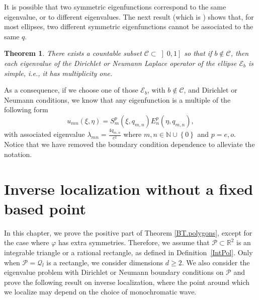 \documentclass{amsart}
\newtheorem{theorem}{Theorem}[section]
\theoremstyle{definition}
\theoremstyle{remark}
\renewcommand\geq\geqslant
\numberwithin{equation}{section}
\theoremstyle{definition}
\theoremstyle{remark}
\begin{document}
It is possible that two symmetric eigenfunctions correspond to the same eigenvalue, or to different eigenvalues. The next result (which is \cite[Theorem 1.1]{Hil}) shows that, for most ellipses, two different symmetric eigenfunctions cannot be associated to the same $q$.
\begin{theorem}\label{Hillariet}
	There exists a countable subset $\mathcal{C}\subset\left]0,1\right]$ so that if $b\notin\mathcal{C}$, then each eigenvalue of the Dirichlet or Neumann Laplace operator of the ellipse $\mathcal{E}_{b}$ is simple, i.e., it has multiplicity one.
\end{theorem}

As a consequence, if we choose one of those $\mathcal{E}_{b}$, with $b\notin\mathcal{C}$, and Dirichlet or Neumann conditions, we know that any eigenfunction is a multiple of the following form\begin{equation}
	u_{mn}\left(\xi,\eta\right)= S^p_m\left(\xi,q_{m,n}\right)E^p_n\left(\eta,q_{m,n}\right),
\end{equation}with associated eigenvalue $\lambda_{mn}=\frac{4q_{m,n}}{c^2}$ where $m,n\in\mathbb{N}\cup\left\{0\right\}$ and $p=e,o$. Notice that we have removed the boundary condition dependence to alleviate the notation.
\section{Inverse localization without a fixed based point}\label{pnf}

    In this chapter, we prove the positive part of Theorem \ref{BT.polygons}, except for the case where $\varphi$ has extra symmetries. Therefore, we assume that $\mathcal{P} \subset \mathbb{R}^2$ is an integrable triangle or a rational rectangle, as defined in Definition~\ref{IntPol}. Only when $\mathcal{P} = \mathcal{Q}_l$ is a rectangle, we consider dimensions $d \geq 2$. We also consider the eigenvalue problem with Dirichlet or Neumann boundary conditions on $\mathcal{P}$ and prove the following result on inverse localization, where the point around which we localize may depend on the choice of monochromatic wave.
\end{document}

